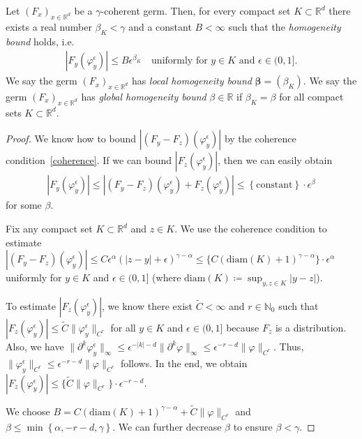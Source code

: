\begin{lemma}\label{lemma:homogeneity-bound}
   Let \({(F_x)}_{x \in \mathbb{R}^d}\) be a \(\gamma\)-coherent germ. Then, for every compact set \(K \subset \mathbb{R}^d\) there exists a real number \(\beta_K < \gamma\) and a constant \(B < \infty\) such that the \emph{homogeneity bound} holds, i.e. 
   \begin{gather*}\label{homogeneity}
                |F_y(\varphi^\epsilon_y)| \leq B\epsilon^{\beta_K} \quad
                \text{uniformly for \(y \in K\) and \(\epsilon \in (0,1]\)}. %
   \end{gather*}
   We say the germ \({(F_x)}_{x \in \mathbb{R}^d}\) has \emph{local homogeneity bound} \(\bm \beta = (\beta_K)\). We say the germ \({(F_x)}_{x \in \mathbb{R}^d}\) has \emph{global homogeneity bound} \(\beta \in \mathbb{R}\) if \(\beta_K = \beta\) for all compact sets \(K \subset \mathbb{R}^d\).
\end{lemma}

\begin{proof}
    We know how to bound \(|(F_y - F_z)(\varphi^\epsilon_y)|\) by the coherence condition~\eqref{coherence}. If we can bound \(|F_z(\varphi^\epsilon_y)|\), then we can easily obtain 
    \begin{align*}
        |F_y(\varphi^\epsilon_y)| \leq |(F_y - F_z)(\varphi^\epsilon_y) + F_z(\varphi^\epsilon_y)| \leq \left\{ \mathrm{constant} \right\} \cdot \epsilon^{\beta}
    \end{align*}
    for some \(\beta\).
    
    Fix any compact set \(K \subset \mathbb{R}^d\) and \(z \in K\). We use the coherence condition to estimate \(|(F_y - F_z)(\varphi^\epsilon_y)| \leq  C \epsilon^{\alpha}(|z-y|+\epsilon)^{\gamma - \alpha} \leq \{ C (\mathrm{diam}(K) + 1)^{\gamma - \alpha} \} \cdot  \epsilon^{\alpha}\) uniformly for \(y \in K\) and \(\epsilon \in (0,1]\) (where \(\mathrm{diam}(K) \coloneqq \sup_{y,z \in K}|y-z| \)). %

    To estimate \(|F_z(\varphi^\epsilon_y)|\), we know there exist \(\tilde C < \infty\) and \(r \in \mathbb{N}_0\) such that \(|F_z(\varphi^\epsilon_y)| \leq \tilde C \lVert \varphi^\epsilon_y \rVert_{C^r}\) for all \(y \in K\) and \(\epsilon \in (0,1]\) because \(F_z\) is a distribution. Also, we have \(\lVert \partial^k\varphi^\epsilon_y \rVert_\infty \leq \epsilon^{-|k|- d} \lVert \partial^k\varphi \rVert_\infty \leq \epsilon^{-r - d} \lVert \varphi \rVert_{C^r}\). Thus, \(\lVert \varphi^\epsilon_y \rVert_{C^r} \leq \epsilon^{-r-d}\lVert \varphi \rVert_{C^r}\) follows. In the end, we obtain 
    \(|F_z(\varphi^\epsilon_y)| \leq \{ \tilde C  \lVert \varphi \rVert_{C^r}  \} \cdot \epsilon^{-r-d}\).

    We choose \(B = C {(\mathrm{diam}(K) + 1)}^{\gamma - \alpha} +  \tilde C  \lVert \varphi \rVert_{C^r}  \) and \(\beta \leq \min \left\{ \alpha, -r-d, \gamma \right\}\). We can further decrease \( \beta \) to ensure \( \beta < \gamma \).
\end{proof}

